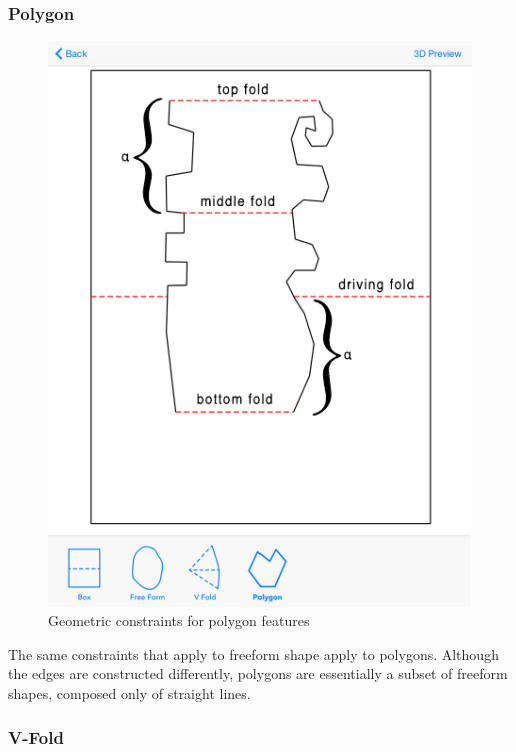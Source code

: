 \subsubsection{Polygon}\label{polygon}

\begin{figure}[htbp]
\centering
\includegraphics{figures/45_Tech_Constraints/polygonConstraints.pdf}
\caption{Geometric constraints for polygon features}
\end{figure}

The same constraints that apply to freeform shape apply to polygons.
Although the edges are constructed differently, polygons are essentially
a subset of freeform shapes, composed only of straight lines.

\subsubsection{V-Fold}\label{v-fold}

